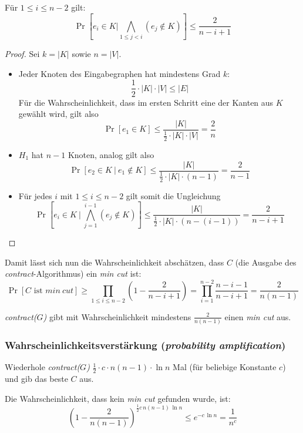 \begin{lemm}
	Für $1 \leq i \leq n-2$ gilt:
	\[ \Pr\left[e_i \in K | \bigwedge_{1\leq j < i} \left(e_j \not\in K\right) \right] \leq \frac{2}{n-i+1} \]
\end{lemm}
\begin{proof} Sei $k = |K|$ sowie $n = |V|$.
	\begin{itemize}
		\item Jeder Knoten des Eingabegraphen hat mindestens Grad $k$:
			\[ \frac{1}{2} \cdot |K| \cdot |V| \leq |E| \]
			Für die Wahrscheinlichkeit, dass im ersten Schritt eine
			der Kanten aus $K$ gewählt wird, gilt also
			\[ \Pr\left[e_1 \in K\right] \leq
			\frac{|K|}{\frac{1}{2}\cdot |K| \cdot |V|} =
			\frac{2}{n} \]
		\item $H_1$ hat $n-1$ Knoten, analog gilt also
			\[ \Pr\left[e_2 \in K\ |\ e_1 \not\in K\right] \leq
			\frac{|K|}{\frac{1}{2}\cdot |K| \cdot (n-1)} =
			\frac{2}{n-1} \]
		\item Für jedes $i$ mit $1 \leq i \leq n-2$ gilt somit die Ungleichung
			\[ \Pr\left[e_i \in K\ \Big|\ \bigwedge_{j=1}^{i-1}
			\left(e_j \not\in K\right)\right] \leq
			\frac{|K|}{\frac{1}{2}\cdot |K| \cdot
			\left(n-(i-1)\right)} = \frac{2}{n-i+1} \]
	\end{itemize}
\end{proof}

Damit lässt sich nun die Wahrscheinlichkeit abschätzen, dass $C$ (die Ausgabe
des \emph{contract}-Algorithmus) ein \emph{min cut} ist:
\[
  \Pr\left[ C \text{ ist } min\ cut\right] \geq \prod_{1\leq i \leq n-2}
  \left(1-\frac{2}{n-i+1}\right) = \prod_{i=1}^{n-2} \frac{n-i-1}{n-i+1} = \frac{2}{n(n-1)}
\]

\begin{satz}
	\emph{contract($G$)} gibt mit Wahrscheinlichkeit mindestens $\frac{2}{n(n-1)}$ einen \emph{min cut} aus.
\end{satz}

\subsubsection{Wahrscheinlichkeitsverstärkung (\emph{probability amplification})}
Wiederhole \emph{contract($G$)} $\frac{1}{2} \cdot c \cdot n(n-1)\cdot \ln n$
Mal (für beliebige Konstante $c$) und gib das beste $C$ aus.

Die Wahrscheinlichkeit, dass kein \emph{min cut} gefunden wurde, ist:
\[
  \left(1-\frac{2}{n(n-1)}\right)^{\frac{1}{2}c\,n(n-1)\,\ln n} \leq e^{-c\,\ln n} = \frac{1}{n^c}
\]

